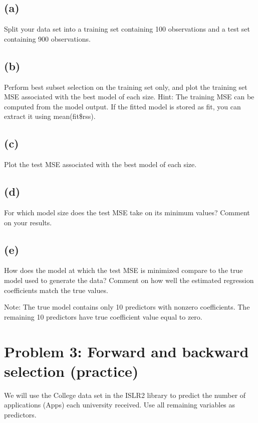 \documentclass[
]{article}
\begin{document}
\subsection{(a)}\label{a-1}

Split your data set into a training set containing 100 observations and
a test set containing 900 observations.

\subsection{(b)}\label{b-1}

Perform best subset selection on the training set only, and plot the
training set MSE associated with the best model of each size. Hint: The
training MSE can be computed from the model output. If the fitted model
is stored as fit, you can extract it using mean(fit\$rss).

\subsection{(c)}\label{c}

Plot the test MSE associated with the best model of each size.

\subsection{(d)}\label{d}

For which model size does the test MSE take on its minimum values?
Comment on your results.

\subsection{(e)}\label{e}

How does the model at which the test MSE is minimized compare to the
true model used to generate the data? Comment on how well the estimated
regression coefficients match the true values.

Note: The true model contains only 10 predictors with nonzero
coefficients. The remaining 10 predictors have true coefficient value
equal to zero.

\section{Problem 3: Forward and backward selection
(practice)}\label{problem-3-forward-and-backward-selection-practice}

We will use the College data set in the ISLR2 library to predict the
number of applications (Apps) each university received. Use all
remaining variables as predictors.
\end{document}
